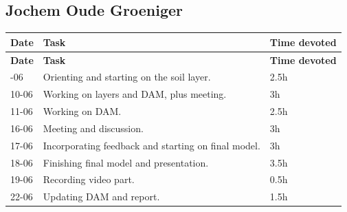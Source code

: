 \subsection*{Jochem Oude Groeniger}
\begin{longtable}{@{}p{2cm}p{9.5cm}p{2.5cm}@{}}
\toprule
\textbf{Date} & \textbf{Task} & \textbf{Time devoted} \\
\midrule
\endfirsthead
\toprule
\textbf{Date} & \textbf{Task} & \textbf{Time devoted} \\
\midrule
\endhead
\bottomrule
\endfoot
05-06 & Orienting and starting on the soil layer. & 2.5h \\
10-06 & Working on layers and DAM, plus meeting. & 3h \\
11-06 & Working on DAM. & 2.5h \\
16-06 & Meeting and discussion. & 3h \\
17-06 & Incorporating feedback and starting on final model. & 3h \\
18-06 & Finishing final model and presentation. & 3.5h \\
19-06 & Recording video part. & 0.5h \\
22-06 & Updating DAM and report. & 1.5h \\
\end{longtable}
